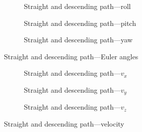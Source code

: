 \begin{figure}[H]
    \centering
    \begin{subfigure}{0.3\textwidth}
        
        \caption{Straight and descending path---roll}
    \end{subfigure}
    \hfill
    \begin{subfigure}{0.3\textwidth}
        
        \caption{Straight and descending path---pitch}
    \end{subfigure}
    \hfill
    \begin{subfigure}{0.3\textwidth}
        
        \caption{Straight and descending path---yaw}
    \end{subfigure}
    \caption{Straight and descending path---Euler angles}\label{fig:straight-descending-euler}
\end{figure}

\begin{figure}[H]
    \centering
    \begin{subfigure}{0.3\textwidth}
        
        \caption{Straight and descending path---$v_x$}
    \end{subfigure}
    \hfill
    \begin{subfigure}{0.3\textwidth}
        
        \caption{Straight and descending path---$v_y$}
    \end{subfigure}
    \hfill
    \begin{subfigure}{0.3\textwidth}
        
        \caption{Straight and descending path---$v_z$}
    \end{subfigure}
    \caption{Straight and descending path---velocity}\label{fig:straight-descending-vel}
\end{figure}


